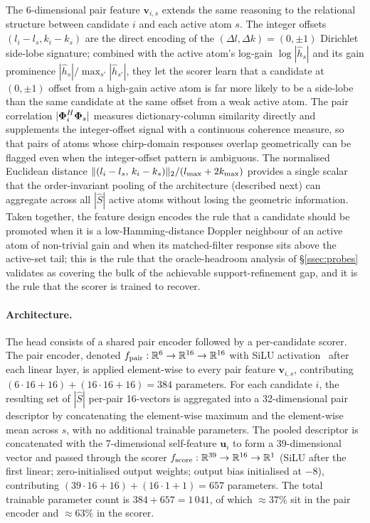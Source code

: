 The 6-dimensional pair feature $\mathbf{v}_{i,s}$ extends the same reasoning to the relational structure between candidate $i$ and each active atom $s$. The integer offsets $(l_i - l_s, k_i - k_s)$ are the direct encoding of the $(\Delta l, \Delta k) = (0, \pm 1)$ Dirichlet side-lobe signature; combined with the active atom's log-gain $\log|\hat{h}_s|$ and its gain prominence $|\hat{h}_s| / \max_{s'}|\hat{h}_{s'}|$, they let the scorer learn that a candidate at $(0, \pm 1)$ offset from a high-gain active atom is far more likely to be a side-lobe than the same candidate at the same offset from a weak active atom. The pair correlation $|\boldsymbol{\Phi}_i^H \boldsymbol{\Phi}_s|$ measures dictionary-column similarity directly and supplements the integer-offset signal with a continuous coherence measure, so that pairs of atoms whose chirp-domain responses overlap geometrically can be flagged even when the integer-offset pattern is ambiguous. The normalised Euclidean distance $\|(l_i - l_s,\, k_i - k_s)\|_2 / (l_{\max} + 2k_{\max})$ provides a single scalar that the order-invariant pooling of the architecture (described next) can aggregate across all $|\hat{S}|$ active atoms without losing the geometric information. Taken together, the feature design encodes the rule that a candidate should be promoted when it is a low-Hamming-distance Doppler neighbour of an active atom of non-trivial gain and when its matched-filter response sits above the active-set tail; this is the rule that the oracle-headroom analysis of \S\ref{ssec:probes} validates as covering the bulk of the achievable support-refinement gap, and it is the rule that the scorer is trained to recover.

\paragraph{Architecture.}
The head consists of a shared pair encoder followed by a per-candidate scorer. The pair encoder, denoted $f_{\text{pair}}: \mathbb{R}^{6} \to \mathbb{R}^{16} \to \mathbb{R}^{16}$ with SiLU activation~\cite{elfwing2018silu} after each linear layer, is applied element-wise to every pair feature $\mathbf{v}_{i,s}$, contributing $(6 \cdot 16 + 16) + (16 \cdot 16 + 16) = 384$ parameters. For each candidate $i$, the resulting set of $|\hat{S}|$ per-pair 16-vectors is aggregated into a 32-dimensional pair descriptor by concatenating the element-wise maximum and the element-wise mean across $s$, with no additional trainable parameters. The pooled descriptor is concatenated with the 7-dimensional self-feature $\mathbf{u}_i$ to form a 39-dimensional vector and passed through the scorer $f_{\text{score}}: \mathbb{R}^{39} \to \mathbb{R}^{16} \to \mathbb{R}^{1}$ (SiLU after the first linear; zero-initialised output weights; output bias initialised at $-8$), contributing $(39 \cdot 16 + 16) + (16 \cdot 1 + 1) = 657$ parameters. The total trainable parameter count is $384 + 657 = 1\,041$, of which $\approx 37\%$ sit in the pair encoder and $\approx 63\%$ in the scorer.

